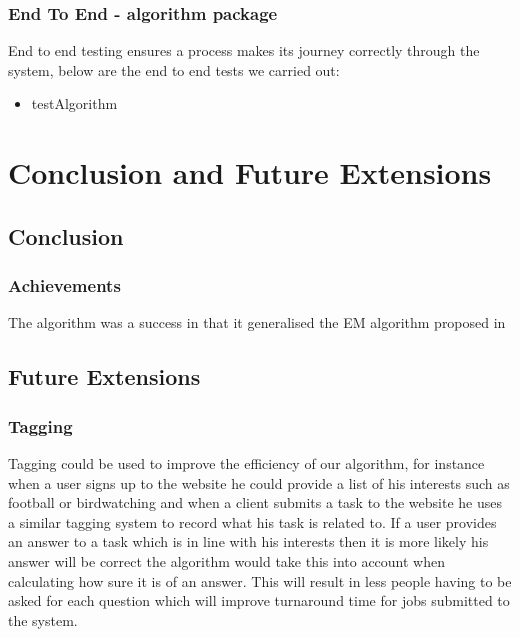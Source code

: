 \documentclass[11pt]{article}
\begin{document}
\subsubsection{End To End - algorithm package}
End to end testing ensures a process makes its journey correctly through the system, below are the end to end tests we carried out:
\begin{itemize}
\item testAlgorithm
\end{itemize}


\section{Conclusion and Future Extensions}

\subsection{Conclusion}
\subsubsection{Achievements}
The algorithm was a success in that it generalised the EM algorithm proposed in 

\subsection{Future Extensions}

\subsubsection{Tagging}
Tagging could be used to improve the efficiency of our algorithm, for instance when a user signs up to the website he could provide a list of his interests such as football or birdwatching and when a client submits a task to the website he uses a similar tagging system to record what his task is related to. If a user provides an answer to a task which is in line with his interests then it is more likely his answer will be correct the algorithm would take this into account when calculating how sure it is of an answer. This will result in less people having to be asked for each question which will improve turnaround time for jobs submitted to the system. 
\end{document}
